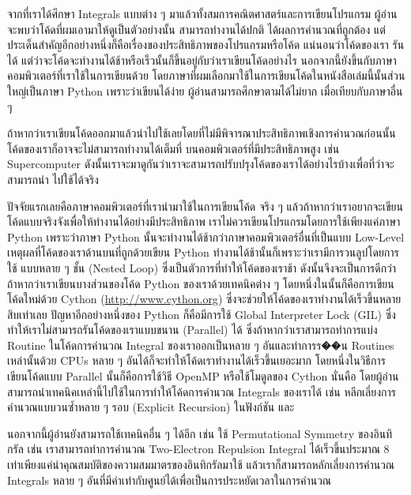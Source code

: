 จากที่เราได้ศึกษา Integrals แบบต่าง ๆ มาแล้วทั้งสมการคณิตศาสตร์และการเขียนโปรแกรม ผู้อ่านจะพบว่าโค้ดที่ผมเอามาให้ดูเป็นตัวอย่างนั้น%
สามารถทำงานได้ปกติ ได้ผลการคำนวณที่ถูกต้อง แต่ประเด็นสำคัญอีกอย่างหนึ่งก็คือเรื่องของประสิทธิภาพของโปรแกรมหรือโค้ด แน่นอนว่าโค้ดของเรา%
รันได้ แต่ว่าจะโค้ดจะทำงานได้ช้าหรือเร็วนั้นก็ขึ้นอยู่กับว่าเราเขียนโค้ดอย่างไร นอกจากนี้ยังขึ้นกับภาษาคอมพิวเตอร์ที่เราใช้ในการเขียนด้วย
โดยภาษาที่ผมเลือกมาใช้ในการเขียนโค้ดในหนังสือเล่มนี้นั้นส่วนใหญ่เป็นภาษา Python เพราะว่าเขียนได้ง่าย ผู้อ่านสามารถศึกษาตามได้ไม่ยาก%
เมื่อเทียบกับภาษาอื่น ๆ

ถ้าหากว่าเราเขียนโค้ดออกมาแล้วนำไปใช้เลยโดยที่ไม่มีพิจารณาประสิทธิภาพเชิงการคำนวณก่อนนั้น โค้ดของเราก็อาจจะไม่สามารถทำงานได้เต็มที่%
บนคอมพิวเตอร์ที่มีประสิทธิภาพสูง เช่น Supercomputer ดังนั้นเราจะมาดูกันว่าเราจะสามารถปรับปรุงโค้ดของเราได้อย่างไรบ้างเพื่อที่ว่าจะสามารถนำ%
ไปใช้ได้จริง

ปัจจัยแรกเลยคือภาษาคอมพิวเตอร์ที่เรานำมาใช้ในการเขียนโค้ด จริง ๆ แล้วถ้าหากว่าเราอยากจะเขียนโค้ดแบบจริงจังเพื่อให้ทำงานได้อย่างมีประสิทธิภาพ
เราไม่ควรเขียนโปรแกรมโดยการใช้เพียงแค่ภาษา Python เพราะว่าภาษา Python นั้นจะทำงานได้ช้ากว่าภาษาคอมพิวเตอร์อื่นที่เป็นแบบ Low-Level
เหตุผลที่โค้ดของเราด้านบนที่ถูกด้วยเขียน Python ทำงานได้ช้านั้นก็เพราะว่าเรามีการวนลูปโดยการใช้  แบบหลาย ๆ ชั้น (Nested
Loop) ซึ่งเป็นตัวการที่ทำให้โค้ดของเราช้า ดังนั้นจึงจะเป็นการดีกว่าถ้าหากว่าเราเขียนบางส่วนของโค้ด Python ของเราด้วยเทคนิคต่าง ๆ
โดยหนึ่งในนั้นก็คือการเขียนโค้ดใหม่ด้วย Cython (\url{http://www.cython.org}) ซึ่งจะช่วยให้โค้ดของเราทำงานได้เร็วขึ้นหลายสิบเท่าเลย
ปัญหาอีกอย่างหนึ่งของ Python ก็คือมีการใช้ Global Interpreter Lock (GIL) ซึ่งทำให้เราไม่สามารถรันโค้ดของเราแบบขนาน (Parallel) ได้
ซึ่งถ้าหากว่าเราสามารถทำการแบ่ง Routine ในโค้ดการคำนวณ Integral ของเราออกเป็นหลาย ๆ อันและทำการร��น Routines เหล่านั้นด้วย
CPUs หลาย ๆ อันได้ก็จะทำให้โค้ดเราทำงานได้เร็วขึ้นเยอะมาก โดยหนึ่งในวิธีการเขียนโค้ดแบบ Parallel นั้นก็คือการใช้วิธี OpenMP
หรือใช้โมดูลของ Cython นั่นคือ  โดยผู้อ่านสามารถนำเทคนิคเหล่านี้ไปใช้ในการทำให้โค้ดการคำนวณ Integrals
ของเราได้ เช่น หลีกเลี่ยงการคำนวณแบบวนซ้ำหลาย ๆ รอบ (Explicit Recursion) ในฟังก์ชัน  และ 

นอกจากนี้ผู้อ่านยังสามารถใช้เทคนิคอื่น ๆ ได้อีก เช่น ใช้ Permutational Symmetry ของอินทิกรัล เช่น เราสามารถทำการคำนวณ Two-Electron
Repulsion Integral ได้เร็วขึ้นประมาณ 8 เท่าเพียงแค่นำคุณสมบัติของความสมมาตรของอินทิกรัลมาใช้ แล้วเราก็สามารถหลักเลี่ยงการคำนวณ
Integrals หลาย ๆ อันที่มีค่าเท่ากับศูนย์ได้เพื่อเป็นการประหยัดเวลาในการคำนวณ

